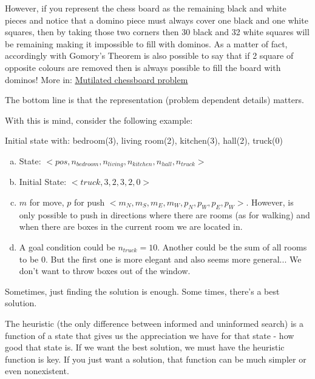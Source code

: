 
However, if you represent the chess board as the remaining black and white pieces and notice that a domino piece must always cover one black and one white squares, then by taking those two corners then 30 black and 32 white squares will be remaining making it impossible to fill with dominos. As a matter of fact, accordingly with Gomory's Theorem is also possible to say that if 2 square of opposite colours are removed then is always possible to fill the board with dominos! More in: \href{https://en.wikipedia.org/wiki/Mutilated_chessboard_problem}{\ul{Mutilated chessboard problem}}

The bottom line is that the representation (problem dependent details) matters.


With this is mind, consider the following example:

Initial state with:
bedroom(3), living room(2), kitchen(3), hall(2), truck(0)



\begin{enumerate}[a)]
    \item State: $<pos, n_{bedroom}, n_{living}, n_{kitchen}, n_{hall}, n_{truck}>$
    \item Initial State: $<truck, 3,2,3,2,0>$
    \item $m$ for move, $p$ for push $<m_N, m_S, m_E, m_W, p_N, p_W, p_E, p_W >$. However, is only possible to push in directions where there are rooms (as for walking) and when there are boxes in the current room we are located in.
    \item A goal condition could be $n_{truck} = 10$. Another could be the sum of all rooms to be 0. But the first one is more elegant and also seems more general... We don't want to throw boxes out of the window.
\end{enumerate}






Sometimes, just finding the solution is enough. Some times, there's a best solution.


The heuristic (the only difference between informed and uninformed search) is a function of a state that gives us the appreciation we have for that state - how good that state is. If we want the best solution, we must have the heuristic function is key. If you just want a solution, that function can be much simpler or even nonexistent.





